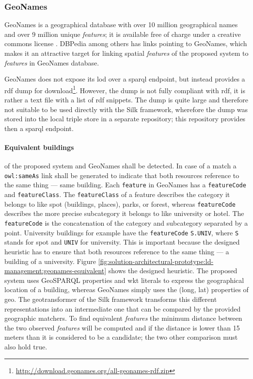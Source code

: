 \documentclass[draft,final]{vutinfth} %
\begin{document}
\subsubsection{GeoNames}

GeoNames is a geographical database with over 10 million geographical names and over 9 million unique \textit{features}; it is available free of charge under a creative commons license \cite{volz_discovering_2009}. DBPedia among others has links pointing to GeoNames, which makes it an attractive target for linking spatial \textit{features} of the proposed system to \textit{features} in GeoNames database.  

GeoNames does not expose its \gls{lod} over a \gls{sparql} endpoint, but instead provides a \gls{rdf} dump for download\footnote{\url{http://download.geonames.org/all-geonames-rdf.zip}}. However, the dump is not fully compliant with \gls{rdf}, it is rather a text file with a list of \gls{rdf} snippets. The dump is quite large and therefore not suitable to be used directly with the Silk framework, wherefore the dump was stored into the local triple store in a separate repository; this repository provides then a \gls{sparql} endpoint. 

\paragraph{Equivalent buildings} of the proposed system and GeoNames shall be detected. In case of a match a \texttt{owl:sameAs} link shall be generated to indicate that both resources reference to the same thing --- same building. Each \texttt{feature} in GeoNames has a \texttt{featureCode} and \texttt{featureClass}. The \texttt{featureClass} of a feature describes the category it belongs to like spot (buildings, places), parks, or forest, whereas \texttt{featureCode} describes the more precise subcategory it belongs to like university or hotel. The \texttt{featureCode} is the concatenation of the category and subcategory separated by a point. University buildings for example have the \texttt{featureCode} \texttt{S.UNIV}, where \texttt{S} stands for spot and \texttt{UNIV} for university. This is important because the designed heuristic has to ensure that both resources reference to the same thing --- a building of a university. Figure \ref{fig:solution-architectural-prototype:ld-management:geonames-equivalent} shows the designed heuristic. The proposed system uses GeoSPARQL properties and \gls{wkt} literals to express the geographical location of a building, whereas GeoNames simply uses the (long, lat) properties of \gls{geo}. The geotransformer of the Silk framework transforms this different representations into an intermediate one that can be compared by the provided geographic matchers. To find equivalent \textit{features} the minimum distance between the two observed \textit{features} will be computed and if the distance is lower than 15 meters than it is considered to be a candidate; the two other comparison must also hold true.  
\end{document}
